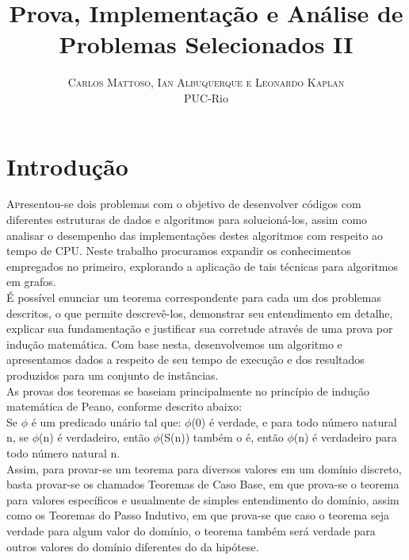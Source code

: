 \documentclass[12pt]{article}
\title{\vspace{-15mm}\fontsize{24pt}{10pt}\selectfont\textbf{Prova, Implementação e Análise de Problemas Selecionados II}} %
\author{
\large
\textsc{Carlos Mattoso, Ian Albuquerque e Leonardo Kaplan}\\[2mm] %
\normalsize PUC-Rio \\ %
}
\date{}
\begin{document}
\maketitle %

\thispagestyle{fancy} %



\section{Introdução}

\lettrine[nindent=0em,lines=3]{A}presentou-se dois problemas com o objetivo de desenvolver códigos com diferentes estruturas de dados e algoritmos para solucioná-los, assim como analisar o desempenho das implementações destes algoritmos com respeito ao tempo de CPU. Neste trabalho procuramos expandir os conhecimentos empregados no primeiro, explorando a aplicação de tais técnicas para algoritmos em grafos.\\

É possível enunciar um teorema correspondente para cada um dos problemas descritos, o que permite descrevê-los, demonstrar seu entendimento em detalhe, explicar sua fundamentação e justificar sua corretude através de uma prova por indução matemática. Com base nesta, desenvolvemos um algoritmo e apresentamos dados a respeito de seu tempo de execução e dos resultados produzidos para um conjunto de instâncias.\\

As provas dos teoremas se baseiam principalmente no princípio de indução matemática de Peano, conforme descrito abaixo:\\

Se $\phi$ é um predicado unário tal que: $\phi$(0) é verdade, e para todo número natural n, se $\phi$(n) é verdadeiro, então $\phi$(S(n)) também o é, então $\phi$(n) é verdadeiro para todo número natural n.\\

Assim, para provar-se um teorema para diversos valores em um domínio discreto, basta provar-se os chamados Teoremas de Caso Base, em que prova-se o teorema para valores específicos e usualmente de simples entendimento do domínio, assim como os Teoremas do Passo Indutivo, em que prova-se que caso o teorema seja verdade para algum valor do domínio, o teorema também será verdade para outros valores do domínio diferentes do da hipótese.\\
\end{document}

